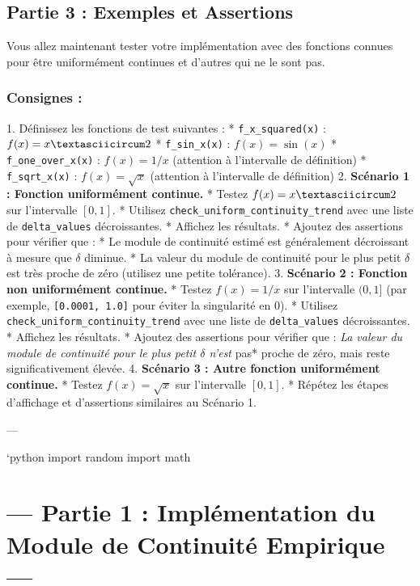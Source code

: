 \documentclass[12pt,a4paper]{report}
\begin{document}
\subsection{Partie 3 : Exemples et Assertions}

Vous allez maintenant tester votre implémentation avec des fonctions connues pour être uniformément continues et d'autres qui ne le sont pas.

\subsubsection{Consignes :}
1.  Définissez les fonctions de test suivantes :
    *   \texttt{f\_x\_squared(x)} : $f(x) = x\textasciicircum 2$
    *   \texttt{f\_sin\_x(x)} : $f(x) = \sin(x)$
    *   \texttt{f\_one\_over\_x(x)} : $f(x) = 1/x$ (attention à l'intervalle de définition)
    *   \texttt{f\_sqrt\_x(x)} : $f(x) = \sqrt{x}$ (attention à l'intervalle de définition)
2.  \textbf{Scénario 1 : Fonction uniformément continue.}
    *   Testez $f(x) = x\textasciicircum 2$ sur l'intervalle $[0, 1]$.
    *   Utilisez \texttt{check\_uniform\_continuity\_trend} avec une liste de \texttt{delta\_values} décroissantes.
    *   Affichez les résultats.
    *   Ajoutez des assertions pour vérifier que :
        *   Le module de continuité estimé est généralement décroissant à mesure que $\delta$ diminue.
        *   La valeur du module de continuité pour le plus petit $\delta$ est très proche de zéro (utilisez une petite tolérance).
3.  \textbf{Scénario 2 : Fonction non uniformément continue.}
    *   Testez $f(x) = 1/x$ sur l'intervalle $(0, 1]$ (par exemple, \texttt{[0.0001, 1.0]} pour éviter la singularité en 0).
    *   Utilisez \texttt{check\_uniform\_continuity\_trend} avec une liste de \texttt{delta\_values} décroissantes.
    *   Affichez les résultats.
    *   Ajoutez des assertions pour vérifier que :
        \textit{   La valeur du module de continuité pour le plus petit $\delta$ n'est }pas* proche de zéro, mais reste significativement élevée.
4.  \textbf{Scénario 3 : Autre fonction uniformément continue.}
    *   Testez $f(x) = \sqrt{x}$ sur l'intervalle $[0, 1]$.
    *   Répétez les étapes d'affichage et d'assertions similaires au Scénario 1.

---

\texttt{}`python
import random
import math

\section{--- Partie 1 : Implémentation du Module de Continuité Empirique ---}
\end{document}
